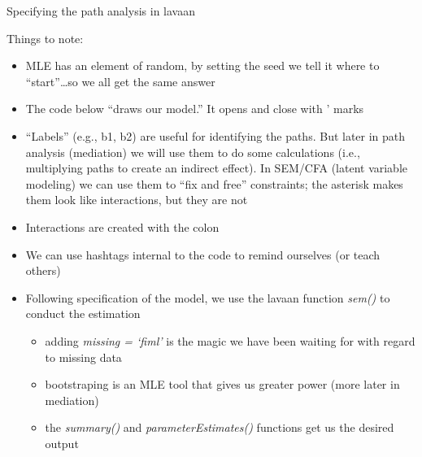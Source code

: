 \documentclass[
]{book}
\providecommand{\tightlist}{%
  \setlength{\itemsep}{0pt}\setlength{\parskip}{0pt}}
\begin{document}
Specifying the path analysis in lavaan

Things to note:

\begin{itemize}
\tightlist
\item
  MLE has an element of random, by setting the seed we tell it where to ``start''\ldots so we all get the same answer
\item
  The code below ``draws our model.'' It opens and close with ' marks
\item
  ``Labels'' (e.g., b1, b2) are useful for identifying the paths. But later in path analysis (mediation) we will use them to do some calculations (i.e., multiplying paths to create an indirect effect). In SEM/CFA (latent variable modeling) we can use them to ``fix and free'' constraints; the asterisk makes them look like interactions, but they are not
\item
  Interactions are created with the colon
\item
  We can use hashtags internal to the code to remind ourselves (or teach others)
\item
  Following specification of the model, we use the lavaan function \emph{sem()} to conduct the estimation

  \begin{itemize}
  \tightlist
  \item
    adding \emph{missing = `fiml'} is the magic we have been waiting for with regard to missing data
  \item
    bootstraping is an MLE tool that gives us greater power (more later in mediation)
  \item
    the \emph{summary()} and \emph{parameterEstimates()} functions get us the desired output
  \end{itemize}
\end{itemize}
\end{document}
